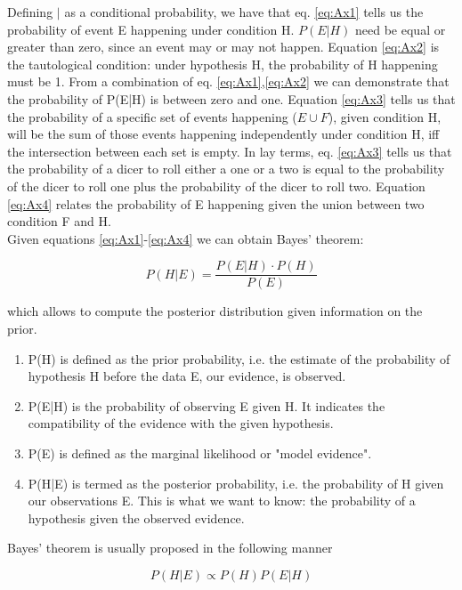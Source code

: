 \documentclass[letterpaper]{article}
\begin{document}
	Defining $|$ as a conditional probability, we have that eq. \ref{eq:Ax1} tells us the probability of event E happening under condition H. $P(E|H)$ need be equal or greater than zero, since an event may or may not happen.
	Equation \ref{eq:Ax2} is the tautological condition: under hypothesis H, the probability of H happening must be 1. From a combination of eq. \ref{eq:Ax1},\ref{eq:Ax2} we can demonstrate that the probability of P(E|H) is between zero and one. Equation \ref{eq:Ax3} tells us that the probability of a specific set of events happening ($E\cup F$), given condition H, will be the sum of those events happening independently under condition H, iff the intersection between each set is empty. In lay terms, eq. \ref{eq:Ax3} tells us that the probability of a dicer to roll either a one or a two is equal to the probability of the dicer to roll one plus the probability of the dicer to roll two. Equation \ref{eq:Ax4} relates the probability of E happening given the union between two condition F and H.\\ \newline
	Given equations \ref{eq:Ax1}-\ref{eq:Ax4} we can obtain Bayes' theorem:
	
	\begin{equation}
	P(H|E)=\frac{P(E|H)\cdot P(H)}{P(E)}
	\end{equation}
	
	which allows to compute the posterior distribution given information on the prior. \begin{enumerate}
		\item P(H) is defined as the prior probability, i.e. the estimate of the probability of hypothesis H before the data E, our evidence, is observed.
		\item P(E|H) is the probability of observing E given H. It indicates the compatibility of the evidence with the given hypothesis.
		\item P(E) is defined as the marginal likelihood or "model evidence".
		\item P(H|E) is termed as the posterior probability, i.e. the probability of H given our observations E. This is what we want to know: the probability of a hypothesis given the observed evidence.
	\end{enumerate} 
	
	Bayes' theorem is usually proposed in the following manner
	
	\begin{equation}
	P(H|E) \propto P(H)P(E|H)
	\end{equation}
	
\end{document}
